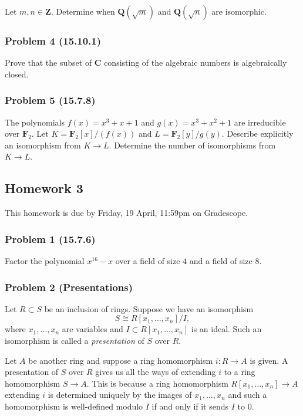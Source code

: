 \documentclass[11pt]{article}
\begin{document}
\bigskip

Let \(m, n \in \mathbf{Z}\).
Determine when \(\mathbf{Q}(\sqrt m)\) and \(\mathbf{Q}(\sqrt n)\) are isomorphic.
\subsubsection{Problem 4 (15.10.1)}
\label{sec:org3dfd913}

Prove that the subset of \(\mathbf{C}\) consisting of the algebraic numbers is algebraically closed.
\subsubsection{Problem 5 (15.7.8)}
\label{sec:org73ed46e}

The polynomials \(f(x) = x^3 + x + 1\) and \(g(x) = x^3 + x^2 + 1\) are irreducible over \(\mathbf{F}_2\).
Let \(K = \mathbf{F}_2[x]/(f(x))\) and \(L = \mathbf{F}_2[y]/g(y)\).
Describe explicitly an isomorphism from \(K \to L\).
Determine the number of isomorphisms from \(K \to L\).
\subsection{Homework 3}
\label{sec:org2e45814}
This homework is due by Friday, 19 April, 11:59pm on Gradescope.
\subsubsection{Problem 1 (15.7.6)}
\label{sec:orga4ec93f}

Factor the polynomial \(x^{16}-x\) over a field of size \(4\) and a field of size \(8\).
\subsubsection{Problem 2 (Presentations)}
\label{sec:org9f0a968}

Let \(R \subset S\) be an inclusion of rings.
Suppose we have an isomorphism
\[ S \cong R[x_1, \dots, x_n]/I, \]
where \(x_1, \dots, x_n\) are variables and \(I \subset R[x_1, \dots, x_n]\) is an ideal.
Such an isomorphism is called a \emph{presentation} of \(S\) over \(R\).

Let \(A\) be another ring and suppose a ring homomorphism \(i \colon R \to A\) is given.
A presentation of \(S\) over \(R\) gives us all the ways of extending \(i\) to a ring homomorphism \(S \to A\).
This is because a ring homomorphism \(R[x_1,\dots,x_n] \to A\) extending \(i\) is determined uniquely by the images of \(x_1, \dots, x_n\) and such a homomorphism is well-defined modulo \(I\) if and only if it sends \(I\) to \(0\).
\end{document}
